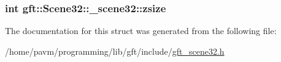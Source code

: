 \hypertarget{structgft_1_1Scene32_1_1__scene32_af18d678198189cc926207beba928dedd}{
\subsubsection[{zsize}]{\setlength{\rightskip}{0pt plus 5cm}int gft\-::\-Scene32\-::\-\_\-scene32\-::zsize}}\label{structgft_1_1Scene32_1_1__scene32_af18d678198189cc926207beba928dedd}


The documentation for this struct was generated from the following file\-:\begin{DoxyCompactItemize}
\item 
/home/pavm/programming/lib/gft/include/\hyperlink{gft__scene32_8h}{gft\-\_\-scene32.\-h}\end{DoxyCompactItemize}
